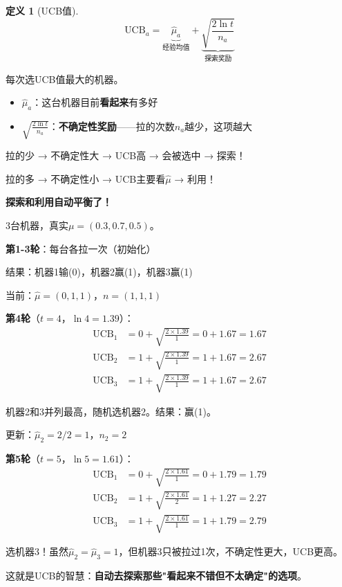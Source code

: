 \documentclass[11pt,a4paper]{article}
\theoremstyle{definition}
\newtheorem{definition}{定义}[section]
\begin{document}
\begin{definition}[UCB值]
\[
\text{UCB}_a = \underbrace{\hat{\mu}_a}_{\text{经验均值}} + \underbrace{\sqrt{\frac{2\ln t}{n_a}}}_{\text{探索奖励}}
\]

每次选UCB值最大的机器。
\end{definition}

\begin{plainwords}[UCB公式的直觉]
\begin{itemize}
    \item $\hat{\mu}_a$：这台机器目前\textbf{看起来}有多好
    \item $\sqrt{\frac{2\ln t}{n_a}}$：\textbf{不确定性奖励}——拉的次数$n_a$越少，这项越大
\end{itemize}

拉的少 → 不确定性大 → UCB高 → 会被选中 → 探索！

拉的多 → 不确定性小 → UCB主要看$\hat{\mu}$ → 利用！

\textbf{探索和利用自动平衡了！}
\end{plainwords}

\begin{calculation}[UCB逐步执行]
3台机器，真实$\mu = (0.3, 0.7, 0.5)$。

\textbf{第1-3轮}：每台各拉一次（初始化）

结果：机器1输(0)，机器2赢(1)，机器3赢(1)

当前：$\hat{\mu} = (0, 1, 1)$，$n = (1, 1, 1)$

\textbf{第4轮}（$t=4$，$\ln 4 = 1.39$）：
\begin{align*}
\text{UCB}_1 &= 0 + \sqrt{\frac{2 \times 1.39}{1}} = 0 + 1.67 = 1.67 \\
\text{UCB}_2 &= 1 + \sqrt{\frac{2 \times 1.39}{1}} = 1 + 1.67 = 2.67 \\
\text{UCB}_3 &= 1 + \sqrt{\frac{2 \times 1.39}{1}} = 1 + 1.67 = 2.67
\end{align*}

机器2和3并列最高，随机选机器2。结果：赢(1)。

更新：$\hat{\mu}_2 = 2/2 = 1$，$n_2 = 2$

\textbf{第5轮}（$t=5$，$\ln 5 = 1.61$）：
\begin{align*}
\text{UCB}_1 &= 0 + \sqrt{\frac{2 \times 1.61}{1}} = 0 + 1.79 = 1.79 \\
\text{UCB}_2 &= 1 + \sqrt{\frac{2 \times 1.61}{2}} = 1 + 1.27 = 2.27 \\
\text{UCB}_3 &= 1 + \sqrt{\frac{2 \times 1.61}{1}} = 1 + 1.79 = 2.79
\end{align*}

选机器3！虽然$\hat{\mu}_2 = \hat{\mu}_3 = 1$，但机器3只被拉过1次，不确定性更大，UCB更高。

这就是UCB的智慧：\textbf{自动去探索那些"看起来不错但不太确定"的选项}。
\end{calculation}
\end{document}
